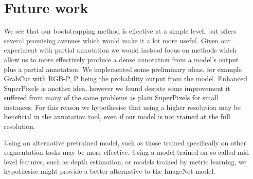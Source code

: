\documentclass{article}
\begin{document}
\section{Future work}


We see that our bootstrapping method is effective at a simple level, but offers several promising avenues which would make it a lot more useful. Given our experiment with partial annotation we would instead focus on methods which allow us to more effectively produce a dense annotation from a model's output plus a partial annotation. We implemented some preliminary ideas, for example GrabCut with RGB-P, P being the probability output from the model.  Enhanced SuperPixels is another idea, however we found despite some improvement it suffered from many of the same problems as plain SuperPixels for small instances. For this reason we hypothesise that using a higher resolution may be beneficial in the annotation tool, even if our model is not trained at the full resolution.

Using an alternative pretrained model, such as those trained specifically on other segmentation tasks may be more effective. Using a model trained on so called mid level features, such as depth estimation, or models trained by metric learning, we hypothesise might provide a better alternative to the ImageNet model.




\end{document}

